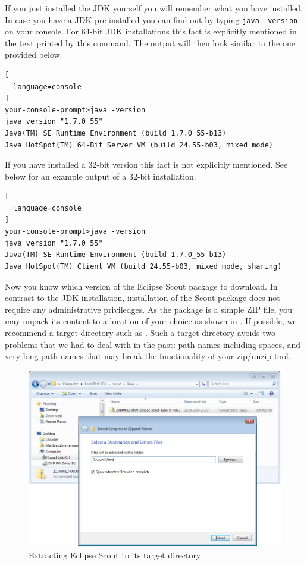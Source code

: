 \documentclass[a4paper,10pt,twoside]{book}
\begin{document}
If you just installed the JDK yourself you will remember what you have installed. 
In case you have a JDK pre-installed you can find out by typing \texttt{java -version} on your console.
For 64-bit JDK installations this fact is explicitly mentioned in the text printed by this command.
The output will then look similar to the one provided below.

\begin{lstlisting}[
  language=console
]
your-console-prompt>java -version
java version "1.7.0_55"
Java(TM) SE Runtime Environment (build 1.7.0_55-b13)
Java HotSpot(TM) 64-Bit Server VM (build 24.55-b03, mixed mode)
\end{lstlisting}

If you have installed a 32-bit version this fact is not explicitly mentioned.
See below for an example output of a 32-bit installation.

\begin{lstlisting}[
  language=console
]
your-console-prompt>java -version
java version "1.7.0_55"
Java(TM) SE Runtime Environment (build 1.7.0_55-b13)
Java HotSpot(TM) Client VM (build 24.55-b03, mixed mode, sharing)
\end{lstlisting}

Now you know which version of the Eclipse Scout package to download.
In contrast to the JDK installation, installation of the Scout package does not require any administrative priviledges.
As the package is a simple ZIP file, you may unpack its content to a location of your choice as shown in . 
If possible, we recommend a target directory such as 
.
Such a target directory avoids two problems that we had to deal with in the past:
path names including spaces, and very long path names that may break the functionality of your zip/unzip tool.

\begin{figure}
\includegraphics[width=13cm]{scout_extract_zip.png}
\caption{Extracting Eclipse Scout to its target directory}
\end{figure}
\end{document}
